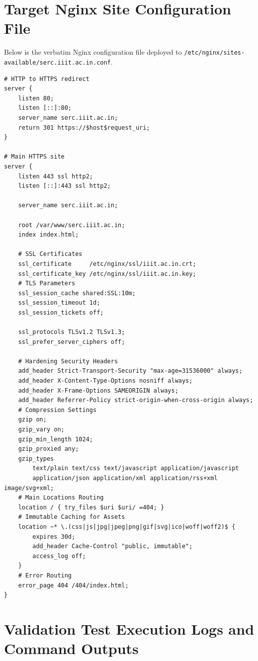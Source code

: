 \documentclass[11pt,a4paper,DIV=16,headings=normal,parskip=half]{scrartcl}
\begin{document}
\clearpage
\section{Target Nginx Site Configuration File}
\label{sec:nginx_config}
Below is the verbatim Nginx configuration file deployed to \texttt{/etc/nginx/sites-available/serc.iiit.ac.in.conf}.

\begin{lstlisting}[language=nginx]
# HTTP to HTTPS redirect
server {
    listen 80;
    listen [::]:80;
    server_name serc.iiit.ac.in;
    return 301 https://$host$request_uri;
}

# Main HTTPS site
server {
    listen 443 ssl http2;
    listen [::]:443 ssl http2;

    server_name serc.iiit.ac.in;

    root /var/www/serc.iiit.ac.in;
    index index.html;

    # SSL Certificates
    ssl_certificate     /etc/nginx/ssl/iiit.ac.in.crt;
    ssl_certificate_key /etc/nginx/ssl/iiit.ac.in.key;
    # TLS Parameters
    ssl_session_cache shared:SSL:10m;
    ssl_session_timeout 1d;
    ssl_session_tickets off;

    ssl_protocols TLSv1.2 TLSv1.3;
    ssl_prefer_server_ciphers off;

    # Hardening Security Headers
    add_header Strict-Transport-Security "max-age=31536000" always;
    add_header X-Content-Type-Options nosniff always;
    add_header X-Frame-Options SAMEORIGIN always;
    add_header Referrer-Policy strict-origin-when-cross-origin always;
    # Compression Settings
    gzip on;
    gzip_vary on;
    gzip_min_length 1024;
    gzip_proxied any;
    gzip_types
        text/plain text/css text/javascript application/javascript
        application/json application/xml application/rss+xml image/svg+xml;
    # Main Locations Routing
    location / { try_files $uri $uri/ =404; }
    # Immutable Caching for Assets
    location ~* \.(css|js|jpg|jpeg|png|gif|svg|ico|woff|woff2)$ {
        expires 30d;
        add_header Cache-Control "public, immutable";
        access_log off;
    }
    # Error Routing
    error_page 404 /404/index.html;
}
\end{lstlisting}

\clearpage
\section{Validation Test Execution Logs and Command Outputs}
\label{sec:validation_logs}
\end{document}
